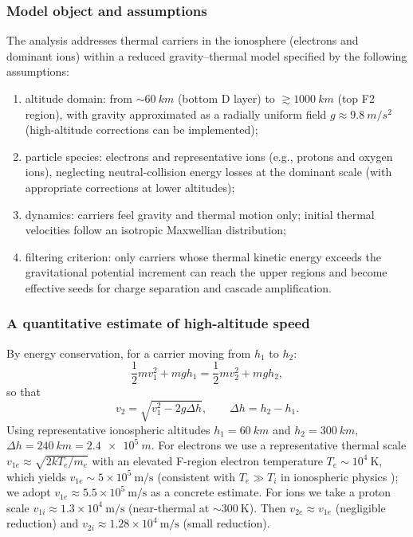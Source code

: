 \documentclass[11pt,a4paper]{article}
\begin{document}
\subsubsection{Model object and assumptions}
The analysis addresses thermal carriers in the ionosphere (electrons and dominant ions) within a reduced gravity--thermal model specified by the following assumptions:
\begin{enumerate}
  \item altitude domain: from $\sim \SI{60}{km}$ (bottom D layer) to $\gtrsim \SI{1000}{km}$ (top F2 region), with gravity approximated as a radially uniform field $g\approx \SI{9.8}{m/s^2}$ (high-altitude corrections can be implemented);
  \item particle species: electrons and representative ions (e.g., protons and oxygen ions), neglecting neutral-collision energy losses at the dominant scale (with appropriate corrections at lower altitudes);
  \item dynamics: carriers feel gravity and thermal motion only; initial thermal velocities follow an isotropic Maxwellian distribution;
  \item filtering criterion: only carriers whose thermal kinetic energy exceeds the gravitational potential increment can reach the upper regions and become effective seeds for charge separation and cascade amplification.
\end{enumerate}

\subsubsection{A quantitative estimate of high-altitude speed}
By energy conservation, for a carrier moving from $h_1$ to $h_2$:
\begin{equation}
\frac{1}{2}mv_1^2+mgh_1=\frac{1}{2}mv_2^2+mgh_2,
\end{equation}
so that
\begin{equation}
v_2=\sqrt{v_1^2-2g\Delta h},
\qquad \Delta h=h_2-h_1.
\end{equation}
Using representative ionospheric altitudes $h_1=\SI{60}{km}$ and $h_2=\SI{300}{km}$, $\Delta h=\SI{240}{km}=\SI{2.4e5}{m}$. For electrons we use a representative thermal scale $v_{1e}\approx \sqrt{2kT_e/m_e}$ with an elevated F-region electron temperature $T_e\sim 10^4~\mathrm{K}$, which yields $v_{1e}\sim 5\times 10^5~\mathrm{m/s}$ (consistent with $T_e\gg T_i$ in ionospheric physics \cite{Kelley2009EarthIonosphere,SchunkNagy2009IonospherePhysics}); we adopt $v_{1e}\approx 5.5\times 10^5~\mathrm{m/s}$ as a concrete estimate. For ions we take a proton scale $v_{1i}\approx 1.3\times 10^4~\mathrm{m/s}$ (near-thermal at $\sim 300~\mathrm{K}$). Then $v_{2e}\approx v_{1e}$ (negligible reduction) and $v_{2i}\approx 1.28\times 10^4~\mathrm{m/s}$ (small reduction).
\end{document}
